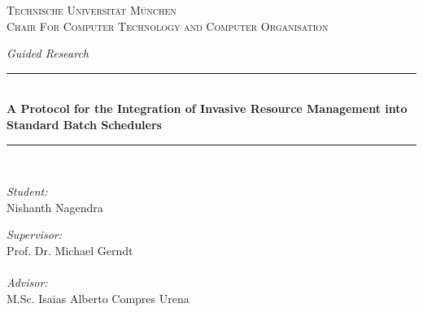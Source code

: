 \documentclass[a4paper, 12pt]{article}
\begin{document}
\begin{titlepage}

\newcommand{\HRule}{\rule{155mm}{0.5mm}} %

\center %


\textsc{\LARGE Technische Universit{\"a}t M{\"u}nchen}\\[1.5cm] %
\textsc{\Large Chair For Computer Technology and Computer Organisation}\\[0.5cm] %

\vspace{30mm}
\begin{center}
\Large\textit{Guided Research}
\end{center}
\HRule \\[0.4cm]
{ \Large \bfseries A Protocol for the Integration of Invasive Resource Management into Standard Batch Schedulers}\\[0.5cm] %
\HRule \\[1.5cm]

\vspace{48mm}
\begin{minipage}{0.4\textwidth}
\begin{flushleft} \large
\emph{Student:}\\
Nishanth Nagendra %
\end{flushleft}
\end{minipage}
\begin{minipage}{0.4\textwidth} 
\begin{flushright} \large
\emph{Supervisor:} \\
Prof. Dr. Michael Gerndt \\~\\ %
\emph{Advisor:} \\
M.Sc. Isaias Alberto Compres Urena  %
\end{flushright}
\end{minipage}\\[2cm]


\end{titlepage}
\end{document}
